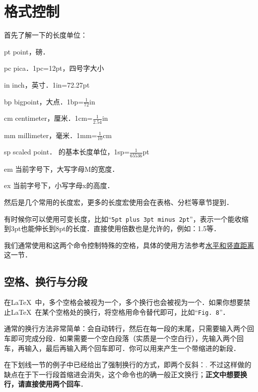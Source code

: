 \section{格式控制}
首先了解一下的长度单位：
\begin{fead}
  \item[pt] point，磅．\label{sec:length}
  \item[pc] pica．1pc=12pt，四号字大小
  \item[in] inch，英寸．1in=72.27pt
  \item[bp] bigpoint，大点．1bp=$\frac{1}{72}$in
  \item[cm] centimeter，厘米．1cm=$\frac{1}{2.54}$in
  \item[mm] millimeter，毫米．1mm=$\frac{1}{10}$cm
  \item[sp] scaled point． 的基本长度单位，1sp=$\frac{1}{65536}$pt
  \item[em] 当前字号下，大写字母M的宽度．
  \item[ex] 当前字号下，小写字母x的高度．
\end{fead}

然后是几个常用的长度宏，更多的长度宏使用会在表格、分栏等章节提到．
\begin{latex}
\textwidth %
\linewidth %
\end{latex}

有时候你可以使用可变长度，比如“\texttt{5pt plus 3pt minus 2pt}”，表示一个能收缩到3pt也能伸长到8pt的长度．直接使用倍数也是允许的，例如：1.5等．

我们通常使用和这两个命令控制特殊的空格，具体的使用方法参考\hyperref[sec:hvspace]{水平和竖直距离}这一节．

\subsection{空格、换行与分段}
在\LaTeX\ 中，多个空格会被视为一个，多个换行也会被视为一个．如果你想要禁止\LaTeX\ 在某个空格处的换行，将空格用\texttt{}命令替代即可，比如“\texttt{Fig. 8}”．

通常的换行方法非常简单：会自动转行，然后在每一段的末尾，只需要输入两个回车即可完成分段．如果需要一个空白段落（实质是一个空白行），先输入两个回车，再输入，最后再输入两个回车即可．你可以用来产生一个带缩进的新段．

在下划线一节的例子中已经给出了强制换行的方式，即两个反斜：. 不过这样做的缺点在于下一行段首缩进会消失，这个命令也的确一般正文换行；\textbf{正文中想要换行，请直接使用两个回车}．

